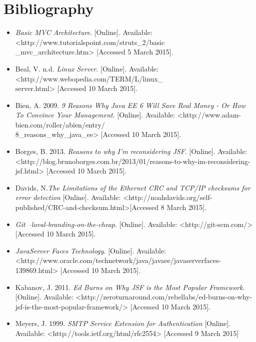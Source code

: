 \documentclass[a4paper,12pt]{report}
\begin{document}
	\section{Bibliography}
		\begin{itemize}
			\item \textit{Basic MVC Architecture}. [Online]. Available: <http://www.tutorialspoint.com/struts\_2/basic\\\_mvc\_architecture.htm> [Accessed 5 March 2015].
			
			\item Beal, V. n.d. \textit{Linux Server}. [Online]. Available: <http://www.webopedia.com/TERM/L/linux\_\\server.html> [Accessed 10 March 2015].

			\item Bien, A. 2009. \textit{9 Reasons Why Java EE 6 Will Save Real Money - Or How To Convince Your Management}. [Online]. Available: <http://www.adam-bien.com/roller/abien/entry/\\8\_reasons\_why\_java\_ee> [Accessed 10 March 2015].

			\item Borges, B. 2013. \textit{Reasons to why I'm reconsidering JSF}. [Online]. Available: <http://blog.brunoborges.com.br/2013/01/reasons-to-why-im-reconsidering-jsf.html> [Accessed 10 March 2015].
			
			\item Davids, N.\textit{The Limitations of the Ethernet CRC and TCP/IP checksums for error detection} [Online]. Available: 
			<http://noahdavids.org/self-published/CRC-and-checksum.html>[Accessed 8 March 2015].

			\item \textit{Git --loval-branding-on-the-cheap}. [Online]. Available: <http://git-scm.com/> [Accessed 10 March 2015].

			\item \textit{JavaServer Faces Technology}. [Online]. Available: <http://www.oracle.com/technetwork/java/javaee/javaserverfaces-139869.html> [Accessed 10 March 2015].

			\item Kabanov, J. 2011. \textit{Ed Burns on Why JSF is the Most Popular Framework}. [Online]. Available: <http://zeroturnaround.com/rebellabs/ed-burns-on-why-jsf-is-the-most-popular-framework/> [Accessed 10 March 2015].
			\item Meyers, J. 1999. \textit{SMTP Service Extension for Authentication} [Online]. Available: <http://tools.ietf.org/html/rfc2554> [Accessed 9 March 2015]


\end{itemize}
\end{document}
